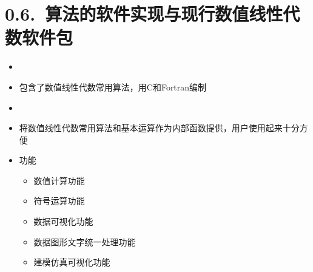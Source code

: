 \section{0.6.~算法的软件实现与现行数值线性代数软件包}

\begin{frame}\ft{\secname}
  \begin{itemize}
  \item 
     \\[0.2cm]
  \item[]
    包含了数值线性代数常用算法，用C和Fortran编制 \\[0.3cm]
  \item
     \\[0.2cm]
  \item[]
    将数值线性代数常用算法和基本运算作为内部函数提供，用户使用起来十分方便 \\[0.2cm]
  \item[]
    功能
    \begin{itemize}
    \item 数值计算功能
    \item 符号运算功能
    \item 数据可视化功能
    \item 数据图形文字统一处理功能
    \item 建模仿真可视化功能
    \end{itemize}
  \end{itemize}
\end{frame}
